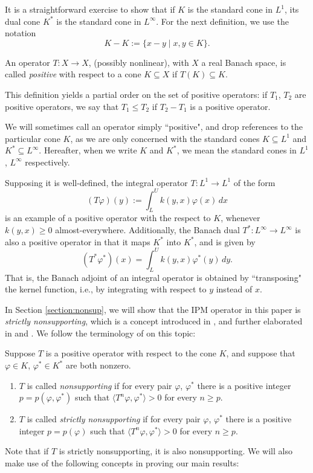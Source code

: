 {	It is a straightforward exercise to show that if $K$ is the standard cone in $L^1$, its dual cone $K^*$ is the standard cone in $L^\infty$. For the next definition, we use the notation
	\[K-K := \{x-y \mid x, y \in K\}.\]
	
	\begin{definition}
		An operator $T:X \to X$, (possibly nonlinear), with $X$ a real Banach space,  is called \emph{positive} with respect to a cone $K \subseteq X$ if $T(K) \subseteq K$.
	\end{definition}
	This definition yields a partial order on the set of positive operators: if $T_1$, $T_2$ are positive operators, we say that $T_1 \leq T_2$ if $T_2 - T_1$ is a positive operator.
	
	We will sometimes call an operator simply ``positive", and drop references to the particular cone $K$, as we are only concerned with the standard cones $K \subseteq L^1$ and $K^* \subseteq L^\infty$. Hereafter, when we write $K$ and $K^*$, we mean the standard cones in $L^1$, $L^\infty$ respectively.
	
	\begin{example}
		Supposing it is well-defined, the integral operator $T:L^1 \to L^1$ of the form
		\[(T\varphi)(y) := \int_L^U k(y,x) \varphi(x) \, dx\]
		is an example of a positive operator with the respect to $K$, whenever $k(y,x) \geq 0$ almost-everywhere. Additionally, the Banach dual $T^*:L^\infty \to L^\infty$ is also a positive operator in that it maps $K^*$ into $K^*$, and is given by
		\[(T^* \varphi^*)(x) = \int_L^U k(y,x) \varphi^*(y) \, dy.\]
		That is, the Banach adjoint of an integral operator is obtained by ``transposing" the kernel function, i.e., by integrating with respect to $y$ instead of $x$.
	\end{example}
	
	In Section \ref{section:nonsup}, we will show that the IPM operator in this paper is \emph{strictly nonsupporting}, which is a concept introduced in \cite{Sawashima1964}, and further elaborated in \cite{Marek1970, Niiro1966a} and \cite{Niiro1966b}. We follow the terminology of \cite{Marek1970} on this topic:
	
	\begin{definition} \label{def:nonsup}
		Suppose $T$ is a positive operator with respect to the cone $K$, and suppose that $\varphi \in K$, $\varphi^* \in K^*$ are both nonzero.
		\begin{enumerate}
			\item $T$ is called \emph{nonsupporting} if for every pair $\varphi$, $\varphi^*$ there is a positive integer $p = p(\varphi, \varphi^*)$ such that $\langle T^n \varphi, \varphi^* \rangle >0$ for every $n \geq p$.
			\item $T$ is called \emph{strictly nonsupporting} if for every pair $\varphi$, $\varphi^*$ there is a positive integer $p=p(\varphi)$ such that $\langle T^n \varphi, \varphi^* \rangle > 0$ for every $n \geq p$.
		\end{enumerate}
	\end{definition}
	Note that if $T$ is strictly nonsupporting, it is also nonsupporting. We will also make use of the following concepts in proving our main results:
	
}
